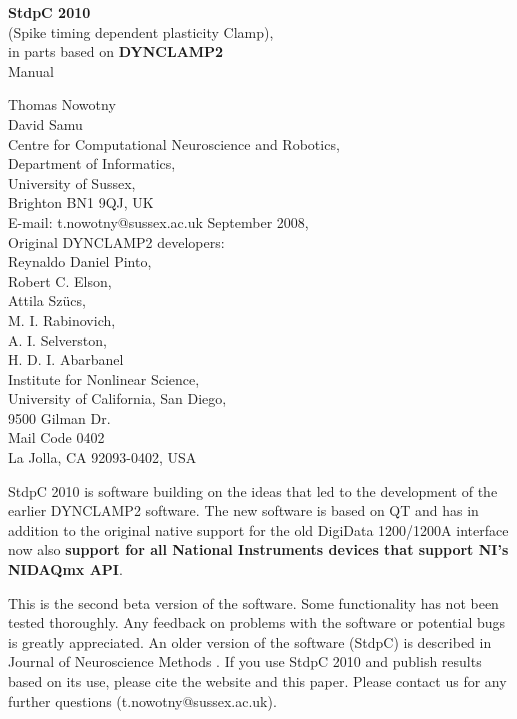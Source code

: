 \documentclass{article}
\begin{document}
\begin{titlepage}
  \begin{center}
  {{\bf \Large 
    StdpC 2010 }\\[0.3cm]
    \large (Spike timing dependent plasticity Clamp)}, \\[1cm]
  {\large 
    in parts based on {\bf DYNCLAMP2} \cite{Pinto2001} 
  } \\[2cm]
  {\sc \Large Manual }
  \end{center}
\vspace*{5cm}

\noindent
{\large Thomas Nowotny} \\
{\large David Samu} \\[0.5cm]
Centre for Computational Neuroscience and Robotics, \\
Department of Informatics, \\
University of Sussex, \\
Brighton BN1 9QJ, UK \\
E-mail: t.nowotny@sussex.ac.uk
September 2008, \\[1cm]
Original DYNCLAMP2 developers: \\[0.2cm]
Reynaldo Daniel Pinto, \\
Robert C. Elson, \\
Attila Sz\"ucs, \\
M. I. Rabinovich, \\
A. I. Selverston,  \\
H. D. I. Abarbanel \\[0.5cm]
Institute for Nonlinear Science, \\
University of California, San Diego, \\
9500 Gilman Dr. \\ Mail Code 0402 \\
La Jolla, CA 92093-0402, USA \\

\end{titlepage}

StdpC 2010 is software building on the ideas that led to the
development of the earlier DYNCLAMP2 software. The new software is
based on QT and has in addition to the original native support for the
old DigiData 1200/1200A interface now also {\bf support for all National
Instruments devices that support NI's NIDAQmx API}.
 
This is the second beta version of the software. Some functionality has
not been tested thoroughly. Any feedback on problems with the
software or potential bugs is greatly appreciated. An older version
of the software (StdpC) is described in Journal of Neuroscience
Methods \cite{Nowotny2006}. If you use StdpC 2010 and publish results
based on its use, please cite the website and this paper. Please
contact us for any further questions (t.nowotny@sussex.ac.uk).
\end{document}
